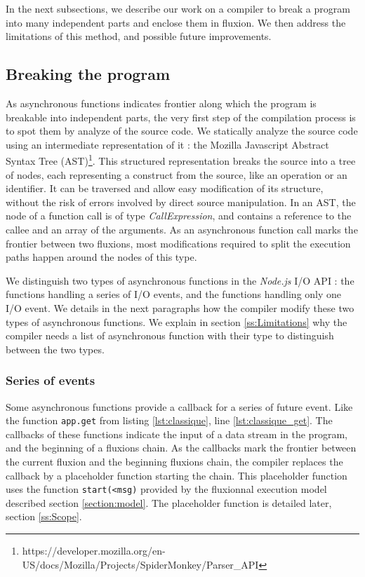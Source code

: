 In the next subsections, we describe our work on a compiler to break a program into many independent parts and enclose them in fluxion.
We then address the limitations of this method, and possible future improvements.

\subsection{Breaking the program}

As asynchronous functions indicates frontier along which the program is breakable into independent parts, the very first step of the compilation process is to spot them by analyze of the source code.
We statically analyze the source code using an intermediate representation of it : the Mozilla Javascript Abstract Syntax Tree (AST)\footnote{\raggedright https://developer.mozilla.org/en-US/docs/Mozilla/Projects/SpiderMonkey/Parser\_API}.
This structured representation breaks the source into a tree of nodes, each representing a construct from the source, like an operation or an identifier.
It can be traversed and allow easy modification of its structure, without the risk of errors involved by direct source manipulation.
In an AST, the node of a function call is of type \textit{CallExpression}, and contains a reference to the callee and an array of the arguments.
As an asynchronous function call marks the frontier between two fluxions, most modifications required to split the execution paths happen around the nodes of this type.

We distinguish two types of asynchronous functions in the \textit{Node.js} I/O API : the functions handling a series of I/O events, and the functions handling only one I/O event.
We details in the next paragraphs how the compiler modify these two types of asynchronous functions.
We explain in section \ref{ss:Limitations} why the compiler needs a list of asynchronous function with their type to distinguish between the two types.

\subsubsection{Series of events} \label{sss:start}

Some asynchronous functions provide a callback for a series of future event.
Like the function \texttt{app.get} from listing \ref{lst:classique}, line \ref{lst:classique_get}.
The callbacks of these functions indicate the input of a data stream in the program, and the beginning of a fluxions chain.
As the callbacks mark the frontier between the current fluxion and the beginning fluxions chain, the compiler replaces the callback by a placeholder function starting the chain.
This placeholder function uses the function \texttt{start(<msg)} provided by the fluxionnal execution model described section \ref{section:model}.
The placeholder function is detailed later, section \ref{ss:Scope}.

